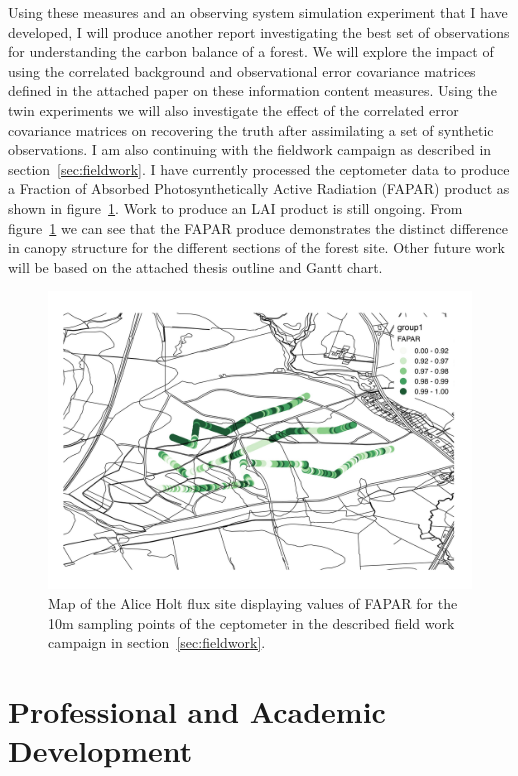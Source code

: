 \documentclass[11pt]{article}
\begin{document}
Using these measures and an observing system simulation experiment that I have developed, I will produce another report investigating the best set of observations for understanding the carbon balance of a forest. We will explore the impact of using the correlated background and observational error covariance matrices defined in the attached paper on these information content measures. Using the twin experiments we will also investigate the effect of the correlated error covariance matrices on recovering the truth after assimilating a set of synthetic observations. I am also continuing with the fieldwork campaign as described in section~\ref{sec:fieldwork}. I have currently processed the ceptometer data to produce a Fraction of Absorbed Photosynthetically Active Radiation (FAPAR) product as shown in figure~\ref{fig:fapar}. Work to produce an LAI product is still ongoing. From figure~\ref{fig:fapar} we can see that the FAPAR produce demonstrates the distinct difference in canopy structure for the different sections of the forest site. Other future work will be based on the attached thesis outline and Gantt chart. 


\begin{figure}[!ht]
    \centering
    \includegraphics[width=.8\textwidth]{ahfapar2.pdf}
    \caption{Map of the Alice Holt flux site displaying values of FAPAR for the 10m sampling points of the ceptometer in the described field work campaign in section~\ref{sec:fieldwork}.}
    \label{fig:fapar}
\end{figure}


\section{Professional and Academic Development}
\end{document}
